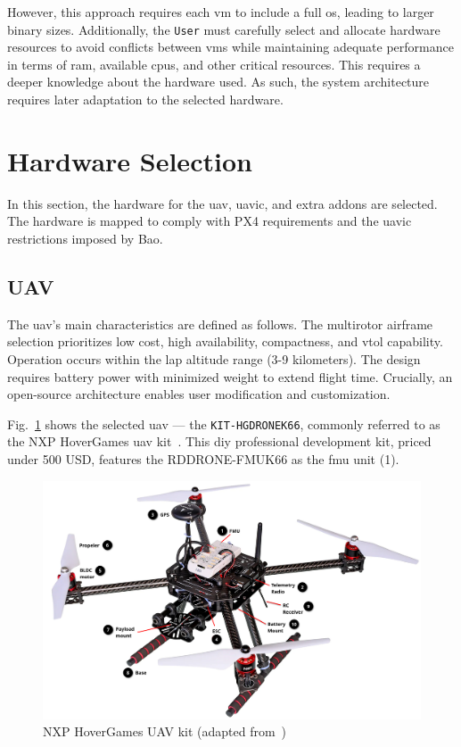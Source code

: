 However, this approach requires each \gls{vm} to include a full \gls{os},
leading to larger binary sizes. Additionally, the \lstinline{User} must carefully
select and allocate hardware resources to avoid conflicts between \glspl{vm}
while maintaining adequate performance in terms of \gls{ram}, available
\glspl{cpu}, and other critical resources. This requires a deeper knowledge
about the hardware used. As such, the system architecture requires later adaptation to the selected hardware.

\section{Hardware Selection}
\label{sec:hardware-selection}
In this section, the hardware for the \gls{uav}, \gls{uavic}, and
extra addons are selected. The hardware is mapped to comply with PX4
requirements and the \gls{uavic} restrictions imposed by Bao.

\subsection{UAV}
\label{sec:uav-hw-sel}
The \gls{uav}'s main characteristics are defined as follows. The multirotor
airframe selection prioritizes low cost, high availability, compactness, and
\gls{vtol} capability. Operation occurs within the \gls{lap} altitude range
(3-9 kilometers). The design requires battery power with minimized weight to
extend flight time. Crucially, an open-source architecture enables user
modification and customization. 

Fig.~\ref{fig:hoverGames-drone} shows the selected \gls{uav} --- the
\lstinline{KIT-HGDRONEK66}, commonly referred to as the NXP HoverGames \gls{uav}
kit~\cite{nxp-hoverGames-uav}. This \gls{diy} professional development kit, priced under
500 USD, features the RDDRONE-FMUK66 as the \gls{fmu} unit (1).

\begin{figure}[!hbt]
  \centering
  \includegraphics[width=1.0\textwidth]{./img/pdf/hoverGames-drone.pdf} 
  \caption[NXP HoverGames UAV kit]{NXP HoverGames UAV kit (adapted from~\cite{nxp-hoverGames-uav})\footnotemark}%
  \label{fig:hoverGames-drone}
\end{figure}
%

